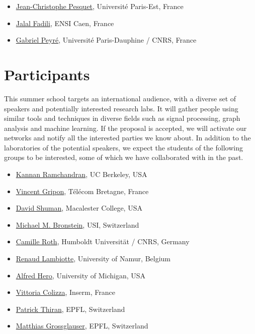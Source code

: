 \documentclass[a4paper]{scrartcl}
\begin{document}
\begin{itemize}
\begin{itemize}
		{Patrick Louis Combettes}, Université Pierre et Marie Curie, France
	\item \href{http://www-syscom.univ-mlv.fr/~pesquet/}
		{Jean-Christophe Pesquet}, Université Paris-Est, France
	\item \href{http://fadili.users.greyc.fr/}
		{Jalal Fadili}, ENSI Caen, France
	\item \href{http://gpeyre.github.io/}
		{Gabriel Peyré}, Université Paris-Dauphine / CNRS, France
	\end{itemize}
\end{itemize}

\section{Participants}

This summer school targets an international audience, with a diverse set of
speakers and potentially interested research labs. It will gather people using
similar tools and techniques in diverse fields such as signal processing, graph
analysis and machine learning. If the proposal is accepted, we will activate our
networks and notify all the interested parties we know about. In addition to
the laboratories of the potential speakers, we expect the students of the
following groups to be interested, some of which we have collaborated with in
the past.
\begin{itemize}
	\setlength{\itemsep}{0pt} \setlength{\parskip}{0pt}
	\item \href{https://www.eecs.berkeley.edu/~kannanr/}
		{Kannan Ramchandran}, UC Berkeley, USA
	\item \href{http://www.vincent-gripon.com/}
		{Vincent Gripon}, Télécom Bretagne, France
	\item \href{http://www.macalester.edu/~dshuman1/}
		{David Shuman}, Macalester College, USA
	\item \href{http://www.inf.usi.ch/bronstein/}
		{Michael M. Bronstein}, USI, Switzerland
	\item \href{http://camille.roth.free.fr/index.php}
		{Camille Roth}, Humboldt Universität / CNRS, Germany
	\item \href{http://xn.unamur.be/}
		{Renaud Lambiotte}, University of Namur, Belgium
	\item \href{https://web.eecs.umich.edu/~hero/}
		{Alfred Hero}, University of Michigan, USA
	\item \href{http://www.epicx-lab.com/vittoria-colizza.html}
		{Vittoria Colizza}, Inserm, France
	\item \href{http://people.epfl.ch/patrick.thiran}
		{Patrick Thiran}, EPFL, Switzerland
	\item \href{http://icapeople.epfl.ch/grossglauser/}
		{Matthias Grossglauser}, EPFL, Switzerland
\end{itemize}
\end{document}
